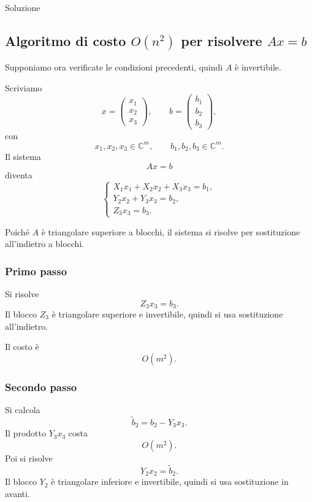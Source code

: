 \documentclass[a4paper]{article}
\begin{document}
\begin{snippetsolution}{Soluzione}
    \subsection*{Algoritmo di costo \(O(n^2)\) per risolvere \(Ax=b\)}

    Supponiamo ora verificate le condizioni precedenti, quindi \(A\) è invertibile.

    Scriviamo
    \[
        x=
        \begin{pmatrix}
            x_1\\
            x_2\\
            x_3
        \end{pmatrix},
        \qquad
        b=
        \begin{pmatrix}
            b_1\\
            b_2\\
            b_3
        \end{pmatrix},
    \]
    con
    \[
        x_1,x_2,x_3\in \mathbb{C}^m,
        \qquad
        b_1,b_2,b_3\in \mathbb{C}^m.
    \]
    Il sistema
    \[
        Ax=b
    \]
    diventa
    \[
        \begin{cases}
            X_1x_1+X_2x_2+X_3x_3=b_1,\\
            Y_2x_2+Y_3x_3=b_2,\\
            Z_3x_3=b_3.
        \end{cases}
    \]

    Poiché \(A\) è triangolare superiore a blocchi, il sistema si risolve per sostituzione all'indietro a blocchi.

    \subsubsection*{Primo passo}

    Si risolve
    \[
        Z_3x_3=b_3.
    \]
    Il blocco \(Z_3\) è triangolare superiore e invertibile, quindi si usa sostituzione all'indietro.

    Il costo è
    \[
        O(m^2).
    \]

    \subsubsection*{Secondo passo}

    Si calcola
    \[
        \widetilde b_2=b_2-Y_3x_3.
    \]
    Il prodotto \(Y_3x_3\) costa
    \[
        O(m^2).
    \]
    Poi si risolve
    \[
        Y_2x_2=\widetilde b_2.
    \]
    Il blocco \(Y_2\) è triangolare inferiore e invertibile, quindi si usa sostituzione in avanti.


\end{snippetsolution}
\end{document}
